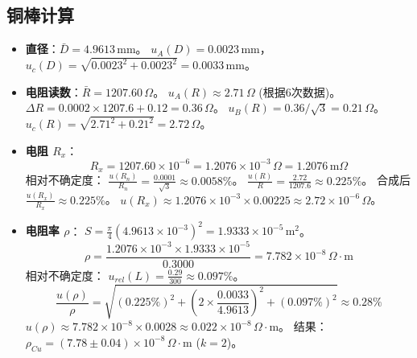 \documentclass[12pt,a4paper]{article}
\begin{document}
\subsection{铜棒计算}
\begin{itemize}
    \item \textbf{直径}：$\bar{D} = 4.9613\,\text{mm}$。
    $u_A(D) = 0.0023\,\text{mm}$， $u_c(D) = \sqrt{0.0023^2 + 0.0023^2} = 0.0033\,\text{mm}$。
    \item \textbf{电阻读数}：$\bar{R} = 1207.60\,\Omega$。
    $u_A(R) \approx 2.71\,\Omega$ (根据6次数据)。
    $\Delta R = 0.0002 \times 1207.6 + 0.12 = 0.36\,\Omega$。
    $u_B(R) = 0.36 / \sqrt{3} = 0.21\,\Omega$。
    $u_c(R) = \sqrt{2.71^2 + 0.21^2} = 2.72\,\Omega$。
    \item \textbf{电阻 $R_x$}：
    \[ R_x = 1207.60 \times 10^{-6} = 1.2076 \times 10^{-3}\,\Omega = 1.2076\,\text{m}\Omega \]
    相对不确定度：
    $\frac{u(R_n)}{R_n} = \frac{0.0001}{\sqrt{3}} \approx 0.0058\%$。
    $\frac{u(R)}{R} = \frac{2.72}{1207.6} \approx 0.225\%$。
    合成后 $\frac{u(R_x)}{R_x} \approx 0.225\%$。
    $u(R_x) \approx 1.2076 \times 10^{-3} \times 0.00225 \approx 2.72 \times 10^{-6}\,\Omega$。
    \item \textbf{电阻率 $\rho$}：
    $S = \frac{\pi}{4}(4.9613\times 10^{-3})^2 = 1.9333 \times 10^{-5}\,\text{m}^2$。
    \[ \rho = \frac{1.2076 \times 10^{-3} \times 1.9333 \times 10^{-5}}{0.3000} = 7.782 \times 10^{-8}\,\Omega\cdot\text{m} \]
    相对不确定度：
    $u_{rel}(L) = \frac{0.29}{300} \approx 0.097\%$。
    \[ \frac{u(\rho)}{\rho} = \sqrt{(0.225\%)^2 + (2 \times \frac{0.0033}{4.9613})^2 + (0.097\%)^2} \approx 0.28\% \]
    $u(\rho) \approx 7.782 \times 10^{-8} \times 0.0028 \approx 0.022 \times 10^{-8}\,\Omega\cdot\text{m}$。
    结果：$\rho_{Cu} = (7.78 \pm 0.04) \times 10^{-8}\,\Omega\cdot\text{m}$ ($k=2$)。
\end{itemize}
\end{document}
